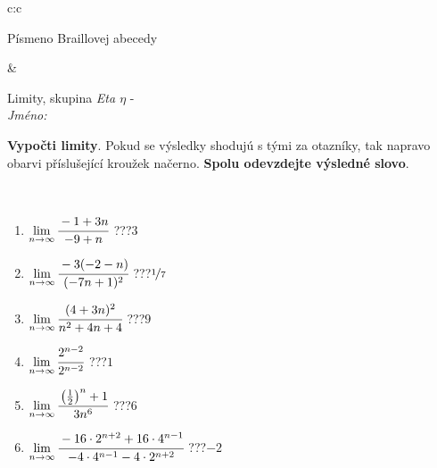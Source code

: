 \documentclass[10pt]{report}
\begin{document}
\begin{tabular}{c:c}
\begin{minipage}[c][104.5mm][t]{0.5\linewidth}
\begin{center}
\begin{minipage}{0.20\linewidth}
\begin{center}
{\small Písmeno Braillovej abecedy}
\end{center}
\end{minipage}
\end{center}
\end{minipage}
&
\begin{minipage}[c][104.5mm][t]{0.5\linewidth}
\begin{center}
\vspace{7mm}
{\huge Limity, skupina \textit{Eta $\eta$} -}\\[5mm]
\textit{Jméno:}\phantom{xxxxxxxxxxxxxxxxxxxxxxxxxxxxxxxxxxxxxxxxxxxxxxxxxxxxxxxxxxxxxxxxx}\\[5mm]
\begin{minipage}{0.95\linewidth}
\begin{center}
\textbf{Vypočti limity}. Pokud se výsledky shodujú s tými za otazníky, tak napravo\\obarvi příslušející kroužek načerno. \textbf{Spolu odevzdejte výsledné slovo}.
\end{center}
\end{minipage}
\\[1mm]
\begin{minipage}{0.79\linewidth}
\begin{center}
\begin{varwidth}{\linewidth}
\begin{enumerate}
\normalsize
\item $\lim\limits_{n\to\infty}\cfrac{-1+3n}{-9+n}$\quad \dotfill\; ???\;\dotfill \quad $3$
\item $\lim\limits_{n\to\infty}\cfrac{-3(-2-n)}{(-7n+1)^2}$\quad \dotfill\; ???\;\dotfill \quad $\nicefrac{1}{7}$
\item $\lim\limits_{n\to\infty}\cfrac{(4+3n)^2}{n^2+4n+4}$\quad \dotfill\; ???\;\dotfill \quad $9$
\item $\lim\limits_{n\to\infty}\cfrac{2^{n-2}}{2^{n-2}}$\quad \dotfill\; ???\;\dotfill \quad $1$
\item $\lim\limits_{n\to\infty}\cfrac{\left(\frac{1}{2}\right)^n +1}{3n^{6}}$\quad \dotfill\; ???\;\dotfill \quad $6$
\item $\lim\limits_{n\to\infty}\cfrac{-16\cdot 2^{n+2}+16\cdot 4^{n-1}}{-4\cdot 4^{n-1}-4\cdot 2^{n+2}}$\quad \dotfill\; ???\;\dotfill \quad $-2$
\end{enumerate}
\end{varwidth}
\end{center}
\end{minipage}
\begin{minipage}{0.20\linewidth}

\end{minipage}
\end{center}
\end{minipage}
\end{tabular}
\end{document}
